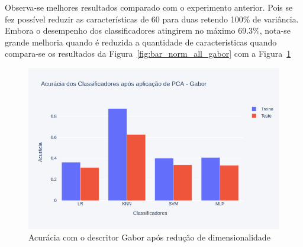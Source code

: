 Observa-se melhores resultados comparado com o experimento anterior. Pois se fez possível reduzir as características de 60 para duas retendo 100\% de variância. Embora o desempenho dos classificadores atingirem no máximo 69.3\%, nota-se grande melhoria quando é reduzida a quantidade de características quando compara-se os resultados da Figura~\ref{fig:bar_norm_all_gabor} com a Figura~\ref{fig:bar_result_gabor}

\begin{figure}[!htbp]
	\centering
	\includegraphics[width=1.0\linewidth,clip=true,trim=0cm 0cm 0cm 0cm, keepaspectratio=true]{bar_result_gabor.png}
	\caption{Acurácia com o descritor Gabor após redução de dimensionalidade}
	\label{fig:bar_result_gabor}
\end{figure}